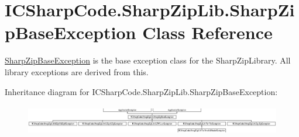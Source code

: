 \hypertarget{class_i_c_sharp_code_1_1_sharp_zip_lib_1_1_sharp_zip_base_exception}{}\section{I\+C\+Sharp\+Code.\+Sharp\+Zip\+Lib.\+Sharp\+Zip\+Base\+Exception Class Reference}
\label{class_i_c_sharp_code_1_1_sharp_zip_lib_1_1_sharp_zip_base_exception}


\hyperlink{class_i_c_sharp_code_1_1_sharp_zip_lib_1_1_sharp_zip_base_exception}{Sharp\+Zip\+Base\+Exception} is the base exception class for the Sharp\+Zip\+Library. All library exceptions are derived from this.  


Inheritance diagram for I\+C\+Sharp\+Code.\+Sharp\+Zip\+Lib.\+Sharp\+Zip\+Base\+Exception\+:\begin{figure}[H]
\begin{center}
\leavevmode
\includegraphics[height=1.353474cm]{class_i_c_sharp_code_1_1_sharp_zip_lib_1_1_sharp_zip_base_exception}
\end{center}
\end{figure}

